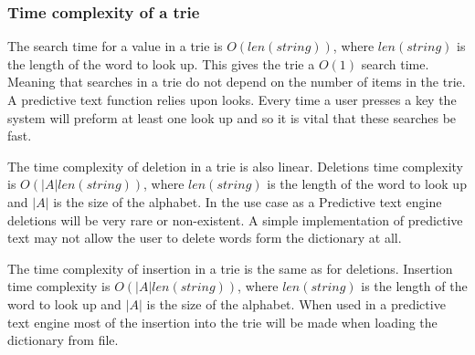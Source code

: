 \documentclass[10pt]{article} %
\begin{document}
			\subsubsection{Time complexity of a trie}
				The search time for a value in a trie is \begin{math}O(len(string))\end{math}, where \begin{math}len(string)\end{math} is the length of the word to look up\cite{book:ADS:complexity}. This gives the trie a \begin{math} O(1) \end{math} search time. Meaning that searches in a trie do not depend on the number of items in the trie. A predictive text function relies upon looks. Every time a user presses a key the system will preform at least one look up and so it is vital that these searches be fast. 
				
				The time complexity of deletion in a trie is also linear. Deletions time complexity is 
				\begin{math}O(\vert A \vert len(string))\end{math}, where \begin{math}len(string)\end{math} is the length of the word to look up and \begin{math}\vert A \vert \end{math} is the size of the alphabet\cite{book:ADS:complexity}. In the use case as a Predictive text engine deletions will be very rare or non-existent. A simple implementation of predictive text may not allow the user to delete words form the dictionary at all. 
				
				The time complexity of insertion in a trie is the same as for deletions. Insertion time complexity is \begin{math}O(\vert A \vert len(string))\end{math}, where \begin{math}len(string)\end{math} is the length of the word to look up and \begin{math}\vert A \vert \end{math} is the size of the alphabet\cite{book:ADS:complexity}. When used in a predictive text engine most of the insertion into the trie will be made when loading the dictionary from file. 
\end{document}
